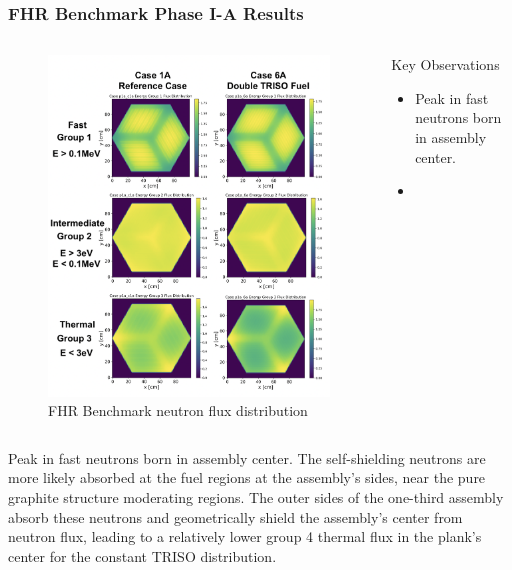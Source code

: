 \begin{frame}
    \frametitle{FHR Benchmark Phase I-A Results}
    \begin{columns}
        \begin{column}{0.6\linewidth}
            \begin{figure}
                \centering
                \includegraphics[width=\linewidth]{figures/phase1a-flux-vert.png} 
                \caption{FHR Benchmark neutron flux distribution}
            \end{figure}
        \end{column}
        \begin{column}{0.4\linewidth}
            Key Observations 
            \begin{itemize}
                \item Peak in fast neutrons born in assembly center.
                \item 
            \end{itemize}
        \end{column}
    \end{columns}
    \vspace{-0.3cm}
    Peak in fast neutrons born in assembly center. 
    The self-shielding neutrons are more likely absorbed at the fuel regions at the 
    assembly's sides, near the pure graphite structure moderating regions. 
    The outer sides of the one-third assembly absorb these neutrons and geometrically 
    shield the assembly's center from neutron flux, leading to a relatively lower group 4 
    thermal flux in the plank's center for the constant TRISO distribution. 
\end{frame}

